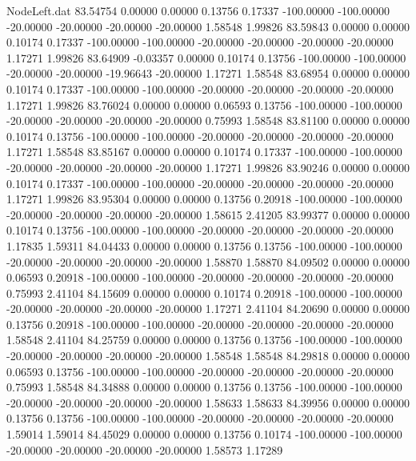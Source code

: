 \begin{filecontents}{NodeLeft.dat}
  83.54754    0.00000    0.00000     0.13756    0.17337 -100.00000 -100.00000  -20.00000  -20.00000  -20.00000  -20.00000    1.58548    1.99826
  83.59843    0.00000    0.00000     0.10174    0.17337 -100.00000 -100.00000  -20.00000  -20.00000  -20.00000  -20.00000    1.17271    1.99826
  83.64909   -0.03357    0.00000     0.10174    0.13756 -100.00000 -100.00000  -20.00000  -20.00000  -19.96643  -20.00000    1.17271    1.58548
  83.68954    0.00000    0.00000     0.10174    0.17337 -100.00000 -100.00000  -20.00000  -20.00000  -20.00000  -20.00000    1.17271    1.99826
  83.76024    0.00000    0.00000     0.06593    0.13756 -100.00000 -100.00000  -20.00000  -20.00000  -20.00000  -20.00000    0.75993    1.58548
  83.81100    0.00000    0.00000     0.10174    0.13756 -100.00000 -100.00000  -20.00000  -20.00000  -20.00000  -20.00000    1.17271    1.58548
  83.85167    0.00000    0.00000     0.10174    0.17337 -100.00000 -100.00000  -20.00000  -20.00000  -20.00000  -20.00000    1.17271    1.99826
  83.90246    0.00000    0.00000     0.10174    0.17337 -100.00000 -100.00000  -20.00000  -20.00000  -20.00000  -20.00000    1.17271    1.99826
  83.95304    0.00000    0.00000     0.13756    0.20918 -100.00000 -100.00000  -20.00000  -20.00000  -20.00000  -20.00000    1.58615    2.41205
  83.99377    0.00000    0.00000     0.10174    0.13756 -100.00000 -100.00000  -20.00000  -20.00000  -20.00000  -20.00000    1.17835    1.59311
  84.04433    0.00000    0.00000     0.13756    0.13756 -100.00000 -100.00000  -20.00000  -20.00000  -20.00000  -20.00000    1.58870    1.58870
  84.09502    0.00000    0.00000     0.06593    0.20918 -100.00000 -100.00000  -20.00000  -20.00000  -20.00000  -20.00000    0.75993    2.41104
  84.15609    0.00000    0.00000     0.10174    0.20918 -100.00000 -100.00000  -20.00000  -20.00000  -20.00000  -20.00000    1.17271    2.41104
  84.20690    0.00000    0.00000     0.13756    0.20918 -100.00000 -100.00000  -20.00000  -20.00000  -20.00000  -20.00000    1.58548    2.41104
  84.25759    0.00000    0.00000     0.13756    0.13756 -100.00000 -100.00000  -20.00000  -20.00000  -20.00000  -20.00000    1.58548    1.58548
  84.29818    0.00000    0.00000     0.06593    0.13756 -100.00000 -100.00000  -20.00000  -20.00000  -20.00000  -20.00000    0.75993    1.58548
  84.34888    0.00000    0.00000     0.13756    0.13756 -100.00000 -100.00000  -20.00000  -20.00000  -20.00000  -20.00000    1.58633    1.58633
  84.39956    0.00000    0.00000     0.13756    0.13756 -100.00000 -100.00000  -20.00000  -20.00000  -20.00000  -20.00000    1.59014    1.59014
  84.45029    0.00000    0.00000     0.13756    0.10174 -100.00000 -100.00000  -20.00000  -20.00000  -20.00000  -20.00000    1.58573    1.17289

\end{filecontents}
